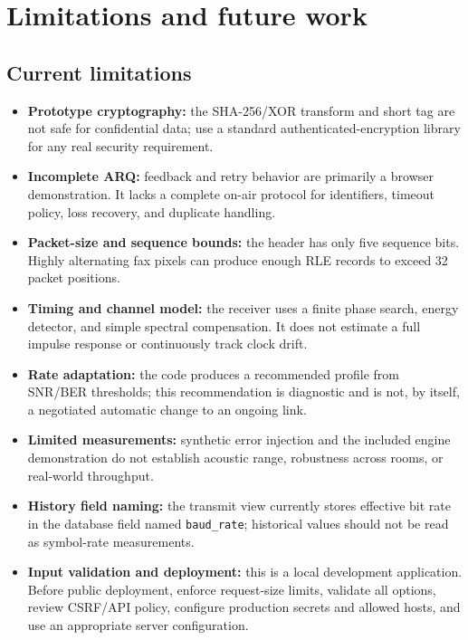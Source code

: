 \documentclass[11pt,a4paper]{article}
\begin{document}
\section{Limitations and future work}
\label{sec:limitations}

\subsection{Current limitations}
\begin{itemize}
    \item \textbf{Prototype cryptography:} the SHA-256/XOR transform and short tag are not safe for confidential data; use a standard authenticated-encryption library for any real security requirement.
    \item \textbf{Incomplete ARQ:} feedback and retry behavior are primarily a browser demonstration. It lacks a complete on-air protocol for identifiers, timeout policy, loss recovery, and duplicate handling.
    \item \textbf{Packet-size and sequence bounds:} the header has only five sequence bits. Highly alternating fax pixels can produce enough RLE records to exceed 32 packet positions.
    \item \textbf{Timing and channel model:} the receiver uses a finite phase search, energy detector, and simple spectral compensation. It does not estimate a full impulse response or continuously track clock drift.
    \item \textbf{Rate adaptation:} the code produces a recommended profile from SNR/BER thresholds; this recommendation is diagnostic and is not, by itself, a negotiated automatic change to an ongoing link.
    \item \textbf{Limited measurements:} synthetic error injection and the included engine demonstration do not establish acoustic range, robustness across rooms, or real-world throughput.
    \item \textbf{History field naming:} the transmit view currently stores effective bit rate in the database field named \texttt{baud\_rate}; historical values should not be read as symbol-rate measurements.
    \item \textbf{Input validation and deployment:} this is a local development application. Before public deployment, enforce request-size limits, validate all options, review CSRF/API policy, configure production secrets and allowed hosts, and use an appropriate server configuration.
\end{itemize}
\end{document}
